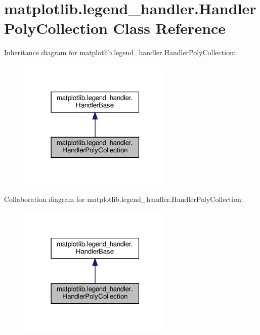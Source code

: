 \hypertarget{classmatplotlib_1_1legend__handler_1_1HandlerPolyCollection}{}\section{matplotlib.\+legend\+\_\+handler.\+Handler\+Poly\+Collection Class Reference}
\label{classmatplotlib_1_1legend__handler_1_1HandlerPolyCollection}


Inheritance diagram for matplotlib.\+legend\+\_\+handler.\+Handler\+Poly\+Collection\+:
\nopagebreak
\begin{figure}[H]
\begin{center}
\leavevmode
\includegraphics[width=210pt]{classmatplotlib_1_1legend__handler_1_1HandlerPolyCollection__inherit__graph}
\end{center}
\end{figure}


Collaboration diagram for matplotlib.\+legend\+\_\+handler.\+Handler\+Poly\+Collection\+:
\nopagebreak
\begin{figure}[H]
\begin{center}
\leavevmode
\includegraphics[width=210pt]{classmatplotlib_1_1legend__handler_1_1HandlerPolyCollection__coll__graph}
\end{center}
\end{figure}
